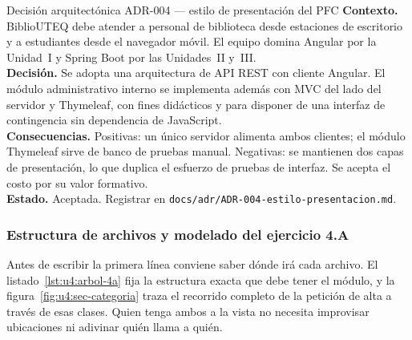\documentclass[11pt,a4paper,openany]{book}
\begin{document}
\begin{cajaadr}{Decisión arquitectónica ADR-004 --- estilo de presentación del PFC}
	\textbf{Contexto.} BiblioUTEQ debe atender a personal de biblioteca desde estaciones de escritorio y a estudiantes desde el navegador móvil. El equipo domina Angular por la Unidad~I y Spring Boot por las Unidades~II y~III.\\[3pt]
	\textbf{Decisión.} Se adopta una arquitectura de API REST con cliente Angular. El módulo administrativo interno se implementa además con MVC del lado del servidor y Thymeleaf, con fines didácticos y para disponer de una interfaz de contingencia sin dependencia de JavaScript.\\[3pt]
	\textbf{Consecuencias.} Positivas: un único servidor alimenta ambos clientes; el módulo Thymeleaf sirve de banco de pruebas manual. Negativas: se mantienen dos capas de presentación, lo que duplica el esfuerzo de pruebas de interfaz. Se acepta el costo por su valor formativo.\\[3pt]
	\textbf{Estado.} Aceptada. Registrar en \texttt{docs/adr/ADR-004-estilo-presentacion.md}.
\end{cajaadr}


\subsubsection{Estructura de archivos y modelado del ejercicio 4.A}

Antes de escribir la primera línea conviene saber dónde irá cada archivo. El listado~\ref{lst:u4:arbol-4a} fija la estructura exacta que debe tener el módulo, y la figura~\ref{fig:u4:sec-categoria} traza el recorrido completo de la petición de alta a través de esas clases. Quien tenga ambos a la vista no necesita improvisar ubicaciones ni adivinar quién llama a quién.
\end{document}
